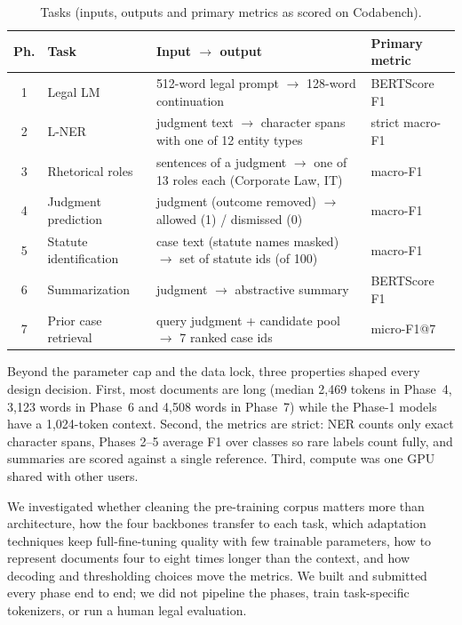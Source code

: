 \documentclass[11pt, oneside]{article}
\begin{document}
\begin{table}[!t]\centering\footnotesize
\caption{Tasks (inputs, outputs and primary metrics as scored on Codabench).}\label{tab:tasks}
\scriptsize\begin{tabularx}{\linewidth}{clXl}\toprule
Ph. & Task & Input $\rightarrow$ output & Primary metric\\\midrule
1 & Legal LM & 512-word legal prompt $\rightarrow$ 128-word continuation & BERTScore F1\\
2 & L-NER & judgment text $\rightarrow$ character spans with one of 12 entity types & strict macro-F1\\
3 & Rhetorical roles & sentences of a judgment $\rightarrow$ one of 13 roles each (Corporate Law, IT) & macro-F1\\
4 & Judgment prediction & judgment (outcome removed) $\rightarrow$ allowed (1) / dismissed (0) & macro-F1\\
5 & Statute identification & case text (statute names masked) $\rightarrow$ set of statute ids (of 100) & macro-F1\\
6 & Summarization & judgment $\rightarrow$ abstractive summary & BERTScore F1\\
7 & Prior case retrieval & query judgment + candidate pool $\rightarrow$ 7 ranked case ids & micro-F1@7\\
\bottomrule\end{tabularx}\end{table}

Beyond the parameter cap and the data lock, three properties shaped every design decision.  First, most
documents are long (median 2,469 tokens in Phase~4, 3,123 words in Phase~6 and 4,508 words in Phase~7) while
the Phase-1 models have a 1,024-token context.  Second, the metrics are strict: NER counts only exact character spans, Phases 2--5 average F1 over
classes so rare labels count fully, and summaries are scored against a single reference.  Third, compute was one
GPU shared with other users.

We investigated whether cleaning the pre-training corpus matters more than architecture, how the four
backbones transfer to each task, which adaptation techniques keep full-fine-tuning quality with few trainable
parameters, how to represent documents four to eight times longer than the context, and how decoding and
thresholding choices move the metrics.  We built and submitted every phase end to end; we did
not pipeline the phases, train task-specific tokenizers, or run a human legal evaluation.
\end{document}
